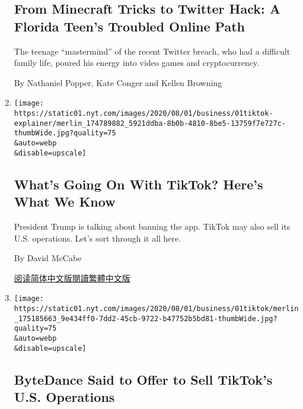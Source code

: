 \begin{enumerate}
  \hypertarget{from-minecraft-tricks-to-twitter-hack-a-florida-teens-troubled-online-path}{%
  \subsection{From Minecraft Tricks to Twitter Hack: A Florida Teen's
  Troubled Online
  Path}\label{from-minecraft-tricks-to-twitter-hack-a-florida-teens-troubled-online-path}}

  The teenage ``mastermind'' of the recent Twitter breach, who had a
  difficult family life, poured his energy into video games and
  cryptocurrency.

  By Nathaniel Popper, Kate Conger and Kellen Browning
\item
  \href{/2020/08/01/technology/tiktok-trump-microsoft-bytedance-china-ban.html}{}

  \texttt{[image: https://static01.nyt.com/images/2020/08/01/business/01tiktok-explainer/merlin\_174789882\_5921ddba-8b0b-4810-8be5-13759f7e727c-thumbWide.jpg?quality=75\\\&auto=webp\\\&disable=upscale]}

  \hypertarget{whats-going-on-with-tiktok-heres-what-we-know}{%
  \subsection{What's Going On With TikTok? Here's What We
  Know}\label{whats-going-on-with-tiktok-heres-what-we-know}}

  President Trump is talking about banning the app. TikTok may also sell
  its U.S. operations. Let's sort through it all here.

  By David McCabe

  \href{https://cn.nytimes.com/technology/20200803/tiktok-trump-microsoft-bytedance-china-ban/}{阅读简体中文版}\href{https://cn.nytimes.com/technology/20200803/tiktok-trump-microsoft-bytedance-china-ban/zh-hant/}{閱讀繁體中文版}
\item
  \href{/2020/08/01/technology/tiktok-sale-trump-ban.html}{}

  \texttt{[image: https://static01.nyt.com/images/2020/08/01/business/01tiktok/merlin\_175185663\_9e434ff0-7dd2-45cb-9722-b47752b5bd81-thumbWide.jpg?quality=75\\\&auto=webp\\\&disable=upscale]}

  \hypertarget{bytedance-said-to-offer-to-sell-tiktoks-us-operations}{%
  \subsection{ByteDance Said to Offer to Sell TikTok's U.S.
  Operations}\label{bytedance-said-to-offer-to-sell-tiktoks-us-operations}}


\end{enumerate}
